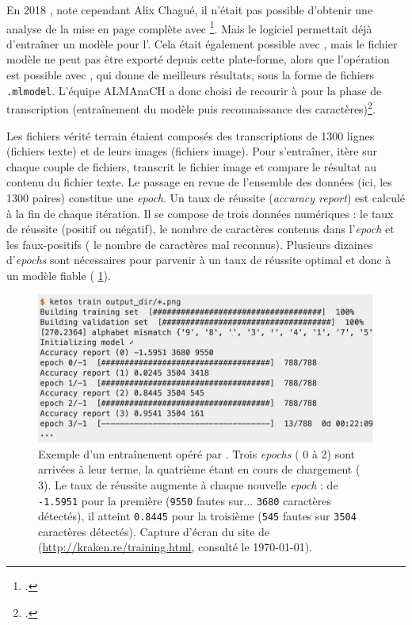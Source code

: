 \og En 2018 \fg, note cependant Alix Chagué, \og il n’était pas possible d’obtenir une analyse de la mise en page complète avec \kraken \fg{}\footcite{chague2}. Mais le logiciel permettait déjà d'entraîner un modèle pour l'\ocr. Cela était également possible avec \transkribus, mais le fichier modèle ne peut pas être exporté depuis cette plate-forme, alors que l'opération est possible avec \kraken{}, qui donne de meilleurs résultats, sous la forme de fichiers \texttt{.mlmodel}. L'équipe ALMAnaCH a donc choisi de recourir à \kraken{} pour la phase de transcription (entraînement du modèle puis reconnaissance des caractères)\footcite{chague2}.

Les fichiers \og vérité terrain \fg{} étaient composés des transcriptions de 1300 lignes (fichiers texte) et de leurs images (fichiers image). Pour s'entraîner, \kraken{} itère sur chaque couple de fichiers, transcrit le fichier image et compare le résultat au contenu du fichier texte. Le passage en revue de l'ensemble des données (ici, les 1300 paires) constitue une \textit{epoch}. Un taux de réussite (\textit{accuracy report}) est calculé à la fin de chaque itération. Il se compose de trois données numériques : le taux de réussite (positif ou négatif), le nombre de caractères contenus dans l'\textit{epoch} et les faux-positifs (\cad{} le nombre de caractères mal reconnus). Plusieurs dizaines d'\textit{epochs} sont nécessaires pour parvenir à un taux de réussite optimal et donc à un modèle fiable (\fig{} \ref{fig:kraken_training}).

\begin{figure}
    \centering
    \includegraphics[width=15cm]{img/kraken_training.png}
    \caption[Exemple d'un entraînement opéré par \kraken]{Exemple d'un entraînement opéré par \kraken. Trois \textit{epochs} (\no{} 0 à 2) sont arrivées à leur terme, la quatrième étant en cours de chargement (\no{} 3). Le taux de réussite augmente à chaque nouvelle \textit{epoch} : de \texttt{-1.5951} pour la première (\texttt{9550} fautes sur... \texttt{3680} caractères détectés), il atteint \texttt{0.8445} pour la troisième (\texttt{545} fautes sur \texttt{3504} caractères détectés). Capture d'écran du site de \kraken{} (\url{http://kraken.re/training.html}, consulté le \today).}
    \label{fig:kraken_training}
\end{figure}

